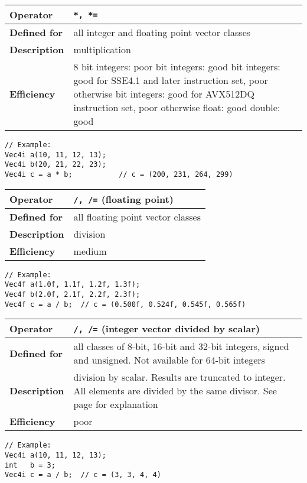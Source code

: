 \documentclass[vcl_manual.tex]{subfiles}
\begin{document}
\begin{tabular}{|p{25mm}|p{100mm}|}
\hline
\bfseries Operator & \texttt{*, *=} \\ \hline
\bfseries Defined for & all integer and floating point vector classes \\ \hline
\bfseries Description & multiplication \\ \hline
\bfseries Efficiency & 8 bit integers: poor \newline
16 bit integers: good \newline
32 bit integers: good for SSE4.1 and later instruction set, poor otherwise \newline
64 bit integers: good for AVX512DQ instruction set, poor otherwise \newline
float: good \newline
double: good
 \\ \hline
\end{tabular}
\begin{lstlisting}[frame=none]
// Example:
Vec4i a(10, 11, 12, 13);
Vec4i b(20, 21, 22, 23);
Vec4i c = a * b;           // c = (200, 231, 264, 299)
\end{lstlisting}


\begin{tabular}{|p{25mm}|p{100mm}|}
\hline
\bfseries Operator & \texttt{/, /=}  (floating point) \\ \hline
\bfseries Defined for & all floating point vector classes \\ \hline
\bfseries Description & division \\ \hline
\bfseries Efficiency & medium \\ \hline
\end{tabular}
\begin{lstlisting}[frame=none]
// Example:
Vec4f a(1.0f, 1.1f, 1.2f, 1.3f);
Vec4f b(2.0f, 2.1f, 2.2f, 2.3f);
Vec4f c = a / b;  // c = (0.500f, 0.524f, 0.545f, 0.565f)
\end{lstlisting}


\begin{tabular}{|p{25mm}|p{100mm}|}
\hline
\bfseries Operator & \texttt{/, /=}  (integer vector divided by scalar) \\ \hline
\bfseries Defined for & all classes of 8-bit, 16-bit and 32-bit integers, signed and unsigned. Not available for 64-bit integers \\ \hline
\bfseries Description & division by scalar. Results are truncated to integer. All elements are divided by the same divisor. See page \pageref{IntegerDivision} for explanation
 \\ \hline
\bfseries Efficiency & poor \\ \hline
\end{tabular}
\begin{lstlisting}[frame=none]
// Example:
Vec4i a(10, 11, 12, 13);
int   b = 3;
Vec4i c = a / b;  // c = (3, 3, 4, 4)
\end{lstlisting}
\end{document}
